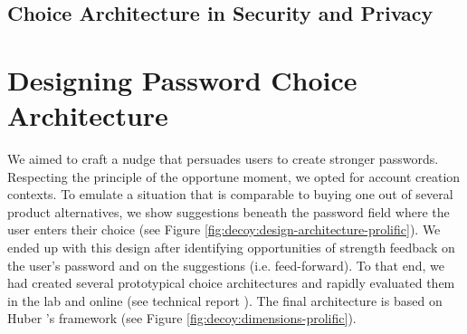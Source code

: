 \subsection{Choice Architecture in Security and Privacy}
\cite{Korff2014TooMuchChoice} \cite{Egelman2013ChoiceArchitecture}
\cite{Renaud2017LessonsLearnedNudges}
\cite{Wang2014PrivacyNudgesFacebook}
\cite{Acquisti2017NudgesPrivacySecurity}
\cite{Malkin2017PersoanlizedSecurityMessaging}
\cite{Jameson2011PreferentialChoice}


\section{Designing Password Choice Architecture}
We aimed to craft a nudge that persuades users to create stronger passwords. Respecting the principle of the opportune moment, we opted for account creation contexts. To emulate a situation that is comparable to buying one out of several product alternatives, we show suggestions beneath the password field where the user enters their choice (see Figure \ref{fig:decoy:design-architecture-prolific}). We ended up with this design after identifying opportunities of strength feedback on the user's password and on the suggestions (i.e. feed-forward). To that end, we had created several prototypical choice architectures and rapidly evaluated them in the lab and online (see technical report \cite{Seitz2016DecoyEffectReport}). The final architecture is based on Huber \etal's framework (see Figure \ref{fig:decoy:dimensions-prolific}).


